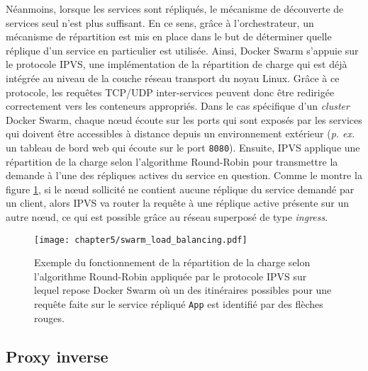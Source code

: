 Néanmoins, lorsque les services sont répliqués, le mécanisme de découverte de services seul n'est plus suffisant. En ce sens, grâce à l'orchestrateur,  un mécanisme de répartition est mis en place dans le but de déterminer quelle réplique d'un service en particulier est utilisée. Ainsi, Docker Swarm s'appuie sur le protocole \ac{IPVS}, une implémentation de la répartition de charge qui est déjà intégrée au niveau de la couche réseau transport du noyau Linux. Grâce à ce protocole, les requêtes \acs{TCP}/\acs{UDP} inter-services peuvent donc être redirigée correctement vers les conteneurs appropriés. Dans le cas spécifique d'un \textit{cluster} Docker Swarm, chaque n\oe{}ud écoute sur les ports qui sont exposés par les services qui doivent être accessibles à distance depuis un environnement extérieur (\textit{p. ex.} un tableau de bord web qui écoute sur le port \texttt{8080}). Ensuite, \acs{IPVS} applique une répartition de la charge selon l'algorithme Round-Robin \citep{Ghaffarinejad2014} pour transmettre la demande à l'une des répliques actives du service en question. Comme le montre la figure \ref{fig:swarm_load_balancing}, si le n\oe{}ud sollicité ne contient aucune réplique du service demandé par un client, alors \acs{IPVS} va router la requête à une réplique active présente sur un autre n\oe{}ud, ce qui est possible grâce au réseau superposé de type \textit{ingress}.

\begin{figure}[H]
	\centering
	\texttt{[image: chapter5/swarm\_load\_balancing.pdf]}
        \caption{Exemple du fonctionnement de la répartition de la charge selon l'algorithme Round-Robin appliquée par le protocole \acs{IPVS} sur lequel repose Docker Swarm où un des itinéraires possibles pour une requête faite sur le service répliqué \texttt{App} est identifié par des flèches rouges.}
	\label{fig:swarm_load_balancing}
\end{figure}

\subsection{Proxy inverse}

